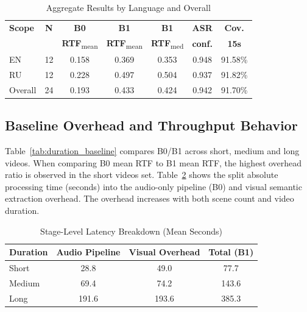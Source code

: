 ﻿\documentclass[conference]{IEEEtran}
\begin{document}
\begin{table}[t]
\caption{Aggregate Results by Language and Overall}
\label{tab:lang_overall}
\centering
\footnotesize
\setlength{\tabcolsep}{4.2pt}
\begin{tabular}{lcccccc}
\toprule
\textbf{Scope} & \textbf{N} & \textbf{B0} & \textbf{B1} & \textbf{B1} & \textbf{ASR} & \textbf{Cov.} \\
 &  & \textbf{RTF}\textsubscript{mean} & \textbf{RTF}\textsubscript{mean} & \textbf{RTF}\textsubscript{med} & \textbf{conf.} & \textbf{15s} \\
\midrule
EN & 12 & 0.158 & 0.369 & 0.353 & 0.948 & 91.58\% \\
RU & 12 & 0.228 & 0.497 & 0.504 & 0.937 & 91.82\% \\
Overall & 24 & 0.193 & 0.433 & 0.424 & 0.942 & 91.70\% \\
\bottomrule
\end{tabular}
\end{table}

\subsection{Baseline Overhead and Throughput Behavior}
Table~\ref{tab:duration_baseline} compares B0/B1 across short, medium and long videos. When comparing B0 mean RTF to B1 mean RTF, the highest overhead ratio is observed in the short videos set. Table~\ref{tab:stage_latency} shows the split absolute processing time (seconds) into the audio-only pipeline (B0) and visual semantic extraction overhead. The overhead increases with both scene count and video duration.

\begin{table}[t]
\caption{Stage-Level Latency Breakdown (Mean Seconds)}
\label{tab:stage_latency}
\centering
\footnotesize
\setlength{\tabcolsep}{5pt}
\begin{tabular}{lccc}
\toprule
\textbf{Duration} & \textbf{Audio Pipeline} & \textbf{Visual Overhead} & \textbf{Total (B1)} \\
\midrule
Short & 28.8 & 49.0 & 77.7 \\
Medium & 69.4 & 74.2 & 143.6 \\
Long & 191.6 & 193.6 & 385.3 \\
\bottomrule
\end{tabular}
\end{table}
\end{document}
